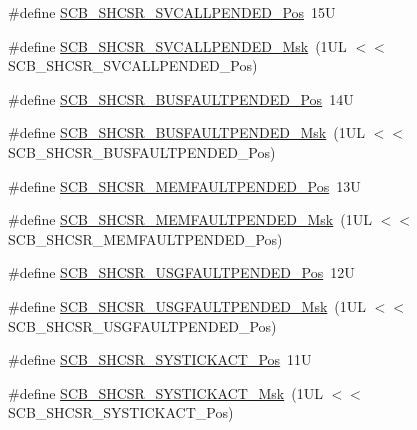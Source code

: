 \begin{DoxyCompactItemize}
\item 
\#define \hyperlink{group___c_m_s_i_s___s_c_b_ga2f93ec9b243f94cdd3e94b8f0bf43641}{S\+C\+B\+\_\+\+S\+H\+C\+S\+R\+\_\+\+S\+V\+C\+A\+L\+L\+P\+E\+N\+D\+E\+D\+\_\+\+Pos}~15U
\item 
\#define \hyperlink{group___c_m_s_i_s___s_c_b_ga6095a7acfbad66f52822b1392be88652}{S\+C\+B\+\_\+\+S\+H\+C\+S\+R\+\_\+\+S\+V\+C\+A\+L\+L\+P\+E\+N\+D\+E\+D\+\_\+\+Msk}~(1\+U\+L $<$$<$ S\+C\+B\+\_\+\+S\+H\+C\+S\+R\+\_\+\+S\+V\+C\+A\+L\+L\+P\+E\+N\+D\+E\+D\+\_\+\+Pos)
\item 
\#define \hyperlink{group___c_m_s_i_s___s_c_b_gaa22551e24a72b65f1e817f7ab462203b}{S\+C\+B\+\_\+\+S\+H\+C\+S\+R\+\_\+\+B\+U\+S\+F\+A\+U\+L\+T\+P\+E\+N\+D\+E\+D\+\_\+\+Pos}~14U
\item 
\#define \hyperlink{group___c_m_s_i_s___s_c_b_ga677c23749c4d348f30fb471d1223e783}{S\+C\+B\+\_\+\+S\+H\+C\+S\+R\+\_\+\+B\+U\+S\+F\+A\+U\+L\+T\+P\+E\+N\+D\+E\+D\+\_\+\+Msk}~(1\+U\+L $<$$<$ S\+C\+B\+\_\+\+S\+H\+C\+S\+R\+\_\+\+B\+U\+S\+F\+A\+U\+L\+T\+P\+E\+N\+D\+E\+D\+\_\+\+Pos)
\item 
\#define \hyperlink{group___c_m_s_i_s___s_c_b_gaceb60fe2d8a8cb17fcd1c1f6b5aa924f}{S\+C\+B\+\_\+\+S\+H\+C\+S\+R\+\_\+\+M\+E\+M\+F\+A\+U\+L\+T\+P\+E\+N\+D\+E\+D\+\_\+\+Pos}~13U
\item 
\#define \hyperlink{group___c_m_s_i_s___s_c_b_ga9abc6c2e395f9e5af4ce05fc420fb04c}{S\+C\+B\+\_\+\+S\+H\+C\+S\+R\+\_\+\+M\+E\+M\+F\+A\+U\+L\+T\+P\+E\+N\+D\+E\+D\+\_\+\+Msk}~(1\+U\+L $<$$<$ S\+C\+B\+\_\+\+S\+H\+C\+S\+R\+\_\+\+M\+E\+M\+F\+A\+U\+L\+T\+P\+E\+N\+D\+E\+D\+\_\+\+Pos)
\item 
\#define \hyperlink{group___c_m_s_i_s___s_c_b_ga3cf03acf1fdc2edc3b047ddd47ebbf87}{S\+C\+B\+\_\+\+S\+H\+C\+S\+R\+\_\+\+U\+S\+G\+F\+A\+U\+L\+T\+P\+E\+N\+D\+E\+D\+\_\+\+Pos}~12U
\item 
\#define \hyperlink{group___c_m_s_i_s___s_c_b_ga122b4f732732010895e438803a29d3cc}{S\+C\+B\+\_\+\+S\+H\+C\+S\+R\+\_\+\+U\+S\+G\+F\+A\+U\+L\+T\+P\+E\+N\+D\+E\+D\+\_\+\+Msk}~(1\+U\+L $<$$<$ S\+C\+B\+\_\+\+S\+H\+C\+S\+R\+\_\+\+U\+S\+G\+F\+A\+U\+L\+T\+P\+E\+N\+D\+E\+D\+\_\+\+Pos)
\item 
\#define \hyperlink{group___c_m_s_i_s___s_c_b_gaec9ca3b1213c49e2442373445e1697de}{S\+C\+B\+\_\+\+S\+H\+C\+S\+R\+\_\+\+S\+Y\+S\+T\+I\+C\+K\+A\+C\+T\+\_\+\+Pos}~11U
\item 
\#define \hyperlink{group___c_m_s_i_s___s_c_b_gafef530088dc6d6bfc9f1893d52853684}{S\+C\+B\+\_\+\+S\+H\+C\+S\+R\+\_\+\+S\+Y\+S\+T\+I\+C\+K\+A\+C\+T\+\_\+\+Msk}~(1\+U\+L $<$$<$ S\+C\+B\+\_\+\+S\+H\+C\+S\+R\+\_\+\+S\+Y\+S\+T\+I\+C\+K\+A\+C\+T\+\_\+\+Pos)
$$
\end{DoxyCompactItemize}
